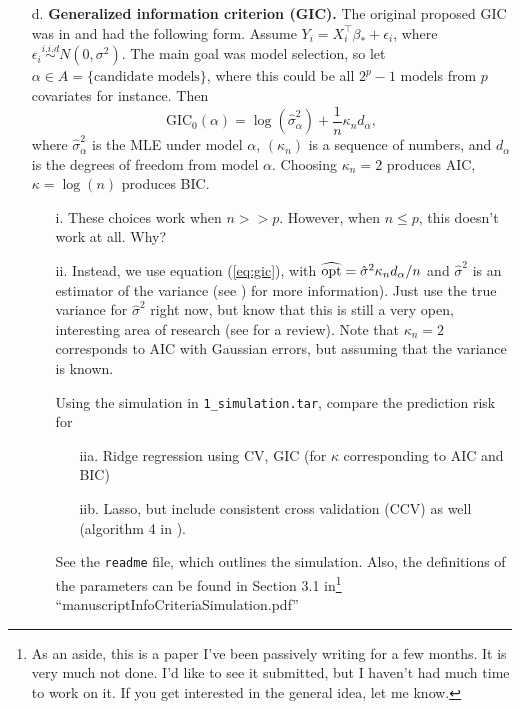 \documentclass[11pt]{article}
\begin{document}
\begin{enumerate}
\begin{itemize}
\begin{itemize}
\end{itemize}
\item[d.]  \textbf{Generalized information criterion (GIC).} 
The original proposed GIC was in \cite{nishii1984asymptotic} and had the following form.  Assume $Y_i = X_i^{\top} \beta_* + \epsilon_i$, where $\epsilon_i \stackrel{i.i.d}{\sim} N(0,\sigma^2)$.  The main goal was model selection, so let
$\alpha \in A = \{ \textrm{candidate models} \}$, where this could be all $2^p - 1$ models from $p$ covariates
for instance.  Then
\[
\textrm{GIC}_0(\alpha) = \log(\hat\sigma_{\alpha}^2) + \frac{1}{n} \kappa_n d_{\alpha},
\]
where $\hat\sigma_{\alpha}^2$ is the MLE under model $\alpha$, $(\kappa_n)$ is a sequence of numbers, and
$d_{\alpha}$ is the degrees of freedom from model $\alpha$.  Choosing $\kappa_n = 2$ produces AIC, $\kappa = \log(n)$ 
produces BIC.  
\begin{itemize}
\item[i.] These choices work when $n >> p$. However, when $n \leq p$, this doesn't work at all. Why?
\item[ii.] Instead, we use equation (\ref{eq:gic}), with $\widehat{\textrm{opt}} = \hat\sigma^2 \kappa_n d_{\alpha}/n$ and $\hat\sigma^2$
is an estimator of the variance (see \cite{zhang2010regularization}) for more information).  Just use the true variance for $\hat\sigma^2$ right now, but know that this is still a very open,
interesting area of research (see \cite{reid2013study} for a review).  Note that $\kappa_n = 2$ corresponds to AIC with 
Gaussian errors, but assuming that the variance is known.

Using the simulation in {\tt 1\_simulation.tar}, compare the prediction risk for
\begin{itemize}
\item[iia.] Ridge regression using CV, GIC (for $\kappa$ corresponding to AIC and BIC)
\item[iib.] Lasso, but include consistent cross validation (CCV) as well (algorithm 4 in \cite{feng2013consistent}).
\end{itemize}
See the {\tt readme} file, which outlines the simulation.  Also, the definitions of the parameters can be found in Section 3.1 
in\footnote{As an aside, this is a paper I've been passively writing for a few months.  It is very much not done. I'd like to 
see it submitted, but I haven't had much time to work on it.  If you get interested in the general idea, let me know.} ``manuscriptInfoCriteriaSimulation.pdf''
\end{itemize}
\end{itemize}
\end{enumerate}

\end{document}
